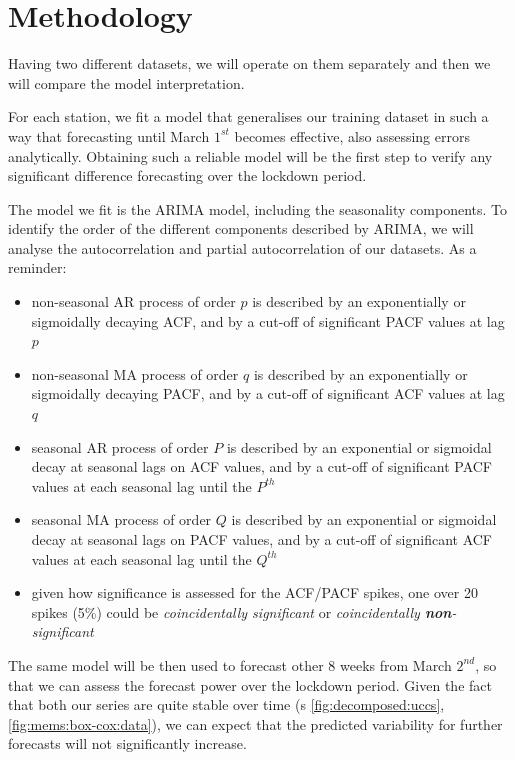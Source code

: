 \documentclass[12pt]{article}
\begin{document}
\section{Methodology}\label{sec:methodology}
Having two different datasets, we will operate on them separately and then we will compare the model interpretation.

For each station, we fit a model that generalises our training dataset in such a way that forecasting until March $1^{st}$ becomes effective, also assessing errors analytically.
Obtaining such a reliable model will be the first step to verify any significant difference forecasting over the lockdown period.

The model we fit is the ARIMA model, including the seasonality components. To identify the order of the different components described by ARIMA, we will analyse the autocorrelation and partial autocorrelation of our datasets.
As a reminder:
\begin{itemize}[topsep=0.5em,itemsep=0em,partopsep=0.5em]
	\item non-seasonal AR process of order $p$ is described by an exponentially or sigmoidally decaying ACF, and by a cut-off of significant PACF values at lag $p$
	\item non-seasonal MA process of order $q$ is described by an exponentially or sigmoidally decaying PACF, and by a cut-off of significant ACF values at lag $q$
	\item seasonal AR process of order $P$ is described by an exponential or sigmoidal decay at seasonal lags on ACF values, and by a cut-off of significant PACF values at each seasonal lag until the $P^{th}$
	\item seasonal MA process of order $Q$ is described by an exponential or sigmoidal decay at seasonal lags on PACF values, and by a cut-off of significant ACF values at each seasonal lag until the $Q^{th}$
	\item given how significance is assessed for the ACF/PACF spikes, one over 20 spikes (5\%) could be \textit{coincidentally significant} or \textit{coincidentally \textbf{non}-significant}
\end{itemize}

The same model will be then used to forecast other 8 weeks from March $2^{nd}$, so that we can assess the forecast power over the lockdown period. Given the fact that both our series are quite stable over time (\figurename{s} \ref{fig:decomposed:uccs}, \ref{fig:mems:box-cox:data}), we can expect that the predicted variability for further forecasts will not significantly increase.
\end{document}
